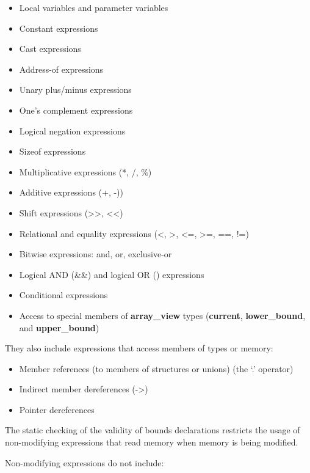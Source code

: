 \documentclass[]{article}
\begin{document}
\begin{itemize}
\item
  Local variables and parameter variables
\item
  Constant expressions
\item
  Cast expressions
\item
  Address-of expressions
\item
  Unary plus/minus expressions
\item
  One's complement expressions
\item
  Logical negation expressions
\item
  Sizeof expressions
\item
  Multiplicative expressions (*, /, \%)
\item
  Additive expressions (+, -))
\item
  Shift expressions (\textgreater{}\textgreater{},
  \textless{}\textless{})
\item
  Relational and equality expressions (\textless{}, \textgreater{},
  \textless{}=, \textgreater{}=, ==, !=)
\item
  Bitwise expressions: and, or, exclusive-or
\item
  Logical AND (\&\&) and logical OR (\textbar{}\textbar{}) expressions
\item
  Conditional expressions
\item
  Access to special members of \textbf{array\_view} types
  (\textbf{current}, \textbf{lower\_bound}, and \textbf{upper\_bound})
\end{itemize}

They also include expressions that access members of types or memory:

\begin{itemize}
\item
  Member references (to members of structures or unions) (the `.'
  operator)
\item
  Indirect member dereferences (-\textgreater{})
\end{itemize}

\begin{itemize}
\item
  Pointer dereferences
\end{itemize}

The static checking of the validity of bounds declarations restricts the
usage of non-modifying expressions that read memory when memory is being
modified.

Non-modifying expressions do not include:
\end{document}
